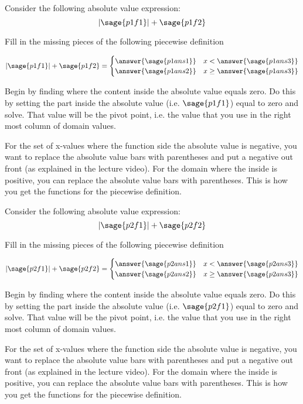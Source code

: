 \documentclass{ximera}
\begin{document}
\begin{problem}
    Consider the following absolute value expression:
    \[
        |\sage{p1f1}| + \sage{p1f2}
    \]
    
    Fill in the missing pieces of the following piecewise definition
    
    \[
        |\sage{p1f1}| + \sage{p1f2} = 
            \begin{cases}
                \answer{\sage{p1ans1}} & x < \answer{\sage{p1ans3}} \\
                \answer{\sage{p1ans2}} & x \geq \answer{\sage{p1ans3}}
            \end{cases}
    \]
    \begin{feedback}
        Begin by finding where the content inside the absolute value equals zero. Do this by setting the part inside the absolute value (i.e. $\sage{p1f1}$) equal to zero and solve. That value will be the pivot point, i.e. the value that you use in the right most column of domain values.
        
        For the set of x-values where the function side the absolute value is negative, you want to replace the absolute value bars with parentheses and put a negative out front (as explained in the lecture video). For the domain where the inside is positive, you can replace the absolute value bars with parentheses. This is how you get the functions for the piecewise definition.
    \end{feedback}
    
\end{problem}


\begin{problem}
    Consider the following absolute value expression:
    \[
        |\sage{p2f1}| + \sage{p2f2}
    \]
    
    Fill in the missing pieces of the following piecewise definition
    
    \[
        |\sage{p2f1}| + \sage{p2f2} = 
            \begin{cases}
                \answer{\sage{p2ans1}} & x < \answer{\sage{p2ans3}} \\
                \answer{\sage{p2ans2}} & x \geq \answer{\sage{p2ans3}}
            \end{cases}
    \]
    
    \begin{feedback}
        Begin by finding where the content inside the absolute value equals zero. Do this by setting the part inside the absolute value (i.e. $\sage{p2f1}$) equal to zero and solve. That value will be the pivot point, i.e. the value that you use in the right most column of domain values.
        
        For the set of x-values where the function side the absolute value is negative, you want to replace the absolute value bars with parentheses and put a negative out front (as explained in the lecture video). For the domain where the inside is positive, you can replace the absolute value bars with parentheses. This is how you get the functions for the piecewise definition.
    \end{feedback}
    
\end{problem}
\end{document}
